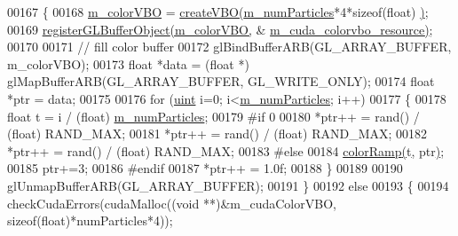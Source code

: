 \begin{DoxyCode}
00167     \{
00168         \hyperlink{class_particle_system_a96b05c719006c9e3eaed759f54a49c7f}{m\_colorVBO} = \hyperlink{class_particle_system_a399eb5cb9c422fd3370899e4d8a5d62e}{createVBO}\hyperlink{class_particle_system_a399eb5cb9c422fd3370899e4d8a5d62e}{(}\hyperlink{class_particle_system_a23d238efa80a647d4b6cde034f486a91}{m\_numParticles}*4*\textcolor{keyword}{sizeof}(\textcolor{keywordtype}{float})
      \hyperlink{class_particle_system_a399eb5cb9c422fd3370899e4d8a5d62e}{)};
00169         \hyperlink{particle_system_8cuh_a4386a84282ceeaba09939817aa2a9c24}{registerGLBufferObject}\hyperlink{particle_system_8cuh_a4386a84282ceeaba09939817aa2a9c24}{(}\hyperlink{class_particle_system_a96b05c719006c9e3eaed759f54a49c7f}{m\_colorVBO}\hyperlink{particle_system_8cuh_a4386a84282ceeaba09939817aa2a9c24}{,} &
      \hyperlink{class_particle_system_a140043869727535abc08609b835b98fc}{m\_cuda\_colorvbo\_resource}\hyperlink{particle_system_8cuh_a4386a84282ceeaba09939817aa2a9c24}{)};
00170 
00171         \textcolor{comment}{// fill color buffer}
00172         glBindBufferARB(GL\_ARRAY\_BUFFER, m\_colorVBO);
00173         \textcolor{keywordtype}{float} *data = (\textcolor{keywordtype}{float} *) glMapBufferARB(GL\_ARRAY\_BUFFER, GL\_WRITE\_ONLY);
00174         \textcolor{keywordtype}{float} *ptr = data;
00175 
00176         \textcolor{keywordflow}{for} (\hyperlink{particles__kernel_8cuh_a91ad9478d81a7aaf2593e8d9c3d06a14}{uint} i=0; i<\hyperlink{class_particle_system_a23d238efa80a647d4b6cde034f486a91}{m\_numParticles}; i++)
00177         \{
00178             \textcolor{keywordtype}{float} t = i / (\textcolor{keywordtype}{float}) \hyperlink{class_particle_system_a23d238efa80a647d4b6cde034f486a91}{m\_numParticles};
00179 #\textcolor{keywordflow}{if} 0
00180             *ptr++ = rand() / (\textcolor{keywordtype}{float}) RAND\_MAX;
00181             *ptr++ = rand() / (\textcolor{keywordtype}{float}) RAND\_MAX;
00182             *ptr++ = rand() / (\textcolor{keywordtype}{float}) RAND\_MAX;
00183 #\textcolor{keywordflow}{else}
00184             \hyperlink{particle_system_8cpp_a1ec1ae39a0b30ca8330f7839a624f302}{colorRamp}\hyperlink{particle_system_8cpp_a1ec1ae39a0b30ca8330f7839a624f302}{(}t\hyperlink{particle_system_8cpp_a1ec1ae39a0b30ca8330f7839a624f302}{,} ptr\hyperlink{particle_system_8cpp_a1ec1ae39a0b30ca8330f7839a624f302}{)};
00185             ptr+=3;
00186 #endif
00187             *ptr++ = 1.0f;
00188         \}
00189 
00190         glUnmapBufferARB(GL\_ARRAY\_BUFFER);
00191     \}
00192     \textcolor{keywordflow}{else}
00193     \{
00194         checkCudaErrors(cudaMalloc((\textcolor{keywordtype}{void} **)&m\_cudaColorVBO, \textcolor{keyword}{sizeof}(\textcolor{keywordtype}{float})*numParticles*4));

\end{DoxyCode}
